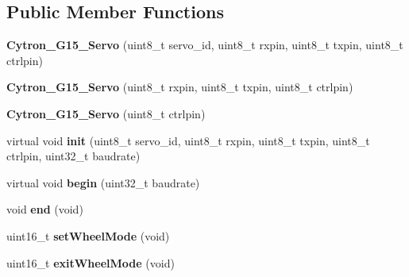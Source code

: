 \subsection*{Public Member Functions}
\begin{DoxyCompactItemize}
\item 
{\bfseries Cytron\+\_\+\+G15\+\_\+\+Servo} (uint8\+\_\+t servo\+\_\+id, uint8\+\_\+t rxpin, uint8\+\_\+t txpin, uint8\+\_\+t ctrlpin)\hypertarget{classCytron__G15__Servo_aaa3bfa9e3a1a5b971f8665f1b90513fa}{}\label{classCytron__G15__Servo_aaa3bfa9e3a1a5b971f8665f1b90513fa}

\item 
{\bfseries Cytron\+\_\+\+G15\+\_\+\+Servo} (uint8\+\_\+t rxpin, uint8\+\_\+t txpin, uint8\+\_\+t ctrlpin)\hypertarget{classCytron__G15__Servo_ada4b9c6d1cf5d84adae77da8950391c7}{}\label{classCytron__G15__Servo_ada4b9c6d1cf5d84adae77da8950391c7}

\item 
{\bfseries Cytron\+\_\+\+G15\+\_\+\+Servo} (uint8\+\_\+t ctrlpin)\hypertarget{classCytron__G15__Servo_ad88800c4a1f68d9fb690d55240bd276d}{}\label{classCytron__G15__Servo_ad88800c4a1f68d9fb690d55240bd276d}

\item 
virtual void {\bfseries init} (uint8\+\_\+t servo\+\_\+id, uint8\+\_\+t rxpin, uint8\+\_\+t txpin, uint8\+\_\+t ctrlpin, uint32\+\_\+t baudrate)\hypertarget{classCytron__G15__Servo_ad99a80c48da7ad7ba969e87c86738599}{}\label{classCytron__G15__Servo_ad99a80c48da7ad7ba969e87c86738599}

\item 
virtual void {\bfseries begin} (uint32\+\_\+t baudrate)\hypertarget{classCytron__G15__Servo_abf8042209ec229112f06c15f039d39b6}{}\label{classCytron__G15__Servo_abf8042209ec229112f06c15f039d39b6}

\item 
void {\bfseries end} (void)\hypertarget{classCytron__G15__Servo_a166e9fd15c06a01d9ba4f19c9dfc6cbe}{}\label{classCytron__G15__Servo_a166e9fd15c06a01d9ba4f19c9dfc6cbe}

\item 
uint16\+\_\+t {\bfseries set\+Wheel\+Mode} (void)\hypertarget{classCytron__G15__Servo_aac2cca8b10b06b39dd8e09789ddee2db}{}\label{classCytron__G15__Servo_aac2cca8b10b06b39dd8e09789ddee2db}

\item 
uint16\+\_\+t {\bfseries exit\+Wheel\+Mode} (void)\hypertarget{classCytron__G15__Servo_a0da8b54cddbb1cbebad151ed38ec6f96}{}\label{classCytron__G15__Servo_a0da8b54cddbb1cbebad151ed38ec6f96}


\end{DoxyCompactItemize}
